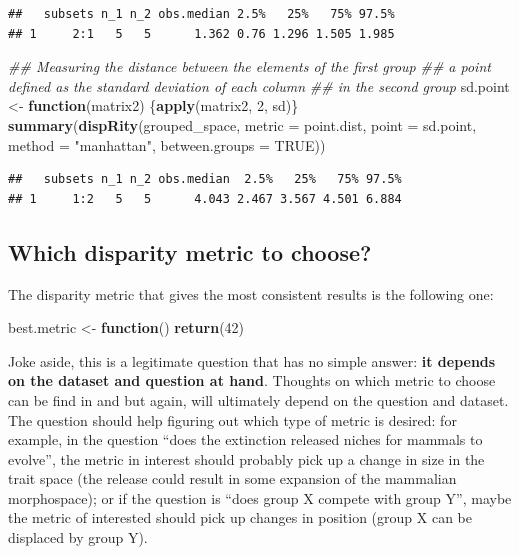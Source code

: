 \documentclass[]{book}
\newenvironment{Shaded}{\begin{snugshade}}{\end{snugshade}}
\newcommand{\CommentTok}[1]{\textcolor[rgb]{0.56,0.35,0.01}{\textit{#1}}}
\newcommand{\ControlFlowTok}[1]{\textcolor[rgb]{0.13,0.29,0.53}{\textbf{#1}}}
\newcommand{\DataTypeTok}[1]{\textcolor[rgb]{0.13,0.29,0.53}{#1}}
\newcommand{\DecValTok}[1]{\textcolor[rgb]{0.00,0.00,0.81}{#1}}
\newcommand{\KeywordTok}[1]{\textcolor[rgb]{0.13,0.29,0.53}{\textbf{#1}}}
\newcommand{\NormalTok}[1]{#1}
\newcommand{\OtherTok}[1]{\textcolor[rgb]{0.56,0.35,0.01}{#1}}
\newcommand{\StringTok}[1]{\textcolor[rgb]{0.31,0.60,0.02}{#1}}
\begin{document}
\begin{verbatim}
##   subsets n_1 n_2 obs.median 2.5%   25%   75% 97.5%
## 1     2:1   5   5      1.362 0.76 1.296 1.505 1.985
\end{verbatim}

\begin{Shaded}
\begin{Highlighting}[]
\CommentTok{## Measuring the distance between the elements of the first group}
\CommentTok{## a point defined as the standard deviation of each column}
\CommentTok{## in the second group}
\NormalTok{sd.point <-}\StringTok{ }\ControlFlowTok{function}\NormalTok{(matrix2) \{}\KeywordTok{apply}\NormalTok{(matrix2, }\DecValTok{2}\NormalTok{, sd)\}}
\KeywordTok{summary}\NormalTok{(}\KeywordTok{dispRity}\NormalTok{(grouped_space, }\DataTypeTok{metric =}\NormalTok{ point.dist,}
                 \DataTypeTok{point =}\NormalTok{ sd.point, }\DataTypeTok{method =} \StringTok{"manhattan"}\NormalTok{,}
                 \DataTypeTok{between.groups =} \OtherTok{TRUE}\NormalTok{))}
\end{Highlighting}
\end{Shaded}

\begin{verbatim}
##   subsets n_1 n_2 obs.median  2.5%   25%   75% 97.5%
## 1     1:2   5   5      4.043 2.467 3.567 4.501 6.884
\end{verbatim}

\hypertarget{which-disparity-metric-to-choose}{%
\subsection{Which disparity metric to choose?}\label{which-disparity-metric-to-choose}}

The disparity metric that gives the most consistent results is the following one:

\begin{Shaded}
\begin{Highlighting}[]
\NormalTok{best.metric <-}\StringTok{ }\ControlFlowTok{function}\NormalTok{() }\KeywordTok{return}\NormalTok{(}\DecValTok{42}\NormalTok{)}
\end{Highlighting}
\end{Shaded}

Joke aside, this is a legitimate question that has no simple answer: \textbf{it depends on the dataset and question at hand}.
Thoughts on which metric to choose can be find in \citet{moms} and \citet{Guillerme2020} but again, will ultimately depend on the question and dataset.
The question should help figuring out which type of metric is desired: for example, in the question ``does the extinction released niches for mammals to evolve'', the metric in interest should probably pick up a change in size in the trait space (the release could result in some expansion of the mammalian morphospace); or if the question is ``does group X compete with group Y'', maybe the metric of interested should pick up changes in position (group X can be displaced by group Y).
\end{document}
